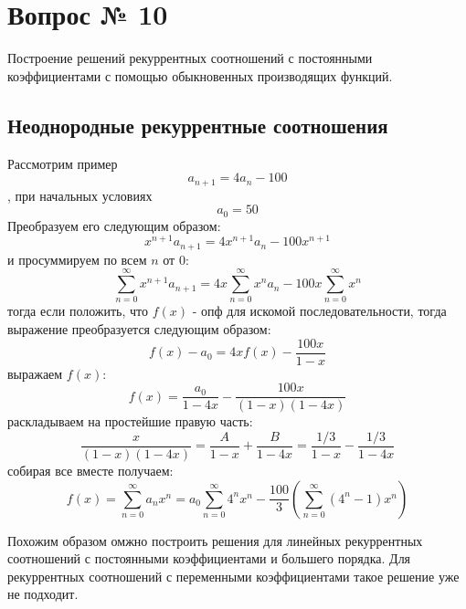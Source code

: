 \chapter{Вопрос № 10}

Построение решений рекуррентных соотношений с постоянными коэффициентами с помощью обыкновенных производящих функций.

\section{Неоднородные рекуррентные соотношения}

Рассмотрим пример $$ a_{n+1} = 4a_n - 100 $$, при начальных условиях
\[
	a_0 = 50
\]
Преобразуем его следующим образом:
\[
	x^{n+1}a_{n+1} = 4x^{n+1}a_n - 100 x^{n+1}
\]
и просуммируем по всем $n$ от 0:
\[
	\sum_{n=0}^{\infty}x^{n+1}a_{n+1} = 4x\sum_{n=0}^\infty x^na_n - 100 x\sum_{n=0}^\infty x^{n}
\]
тогда если положить, что $f\left(x\right)$ - опф для искомой последовательности, тогда выражение преобразуется следующим образом:
\[
	f\left(x\right) - a_0 = 4xf\left(x\right) - \frac{100 x}{1 - x}
\]
выражаем $f\left(x\right)$:
\[
	f\left(x\right) = \frac{a_0}{1-4x} - \frac{100x}{\left(1-x\right)\left(1-4x\right)}
\]
раскладываем на простейшие правую часть:
\[
	\frac{x}{\left(1-x\right)\left(1-4x\right)} = \frac{A}{1-x} + \frac{B}{1-4x} = \frac{1/3}{1-x} - \frac{1/3}{1-4x}
\]
собирая все вместе получаем:
\[
	f\left(x\right) = \sum_{n=0}^\infty a_n x^n = a_0\sum_{n=0}^\infty 4^n x^n - \frac{100}{3}\left(\sum_{n=0}^{\infty} \left(4^n-1\right) x^n \right)
\]

Похожим образом омжно построить решения для линейных рекуррентных соотношений с постоянными коэффициентами и большего порядка. Для рекуррентных соотношений с переменными коэффициентами такое решение уже не подходит.
